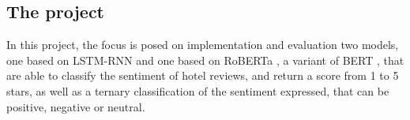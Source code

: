     \subsection{The project}
    \label{subsec:the_project}
        In this project, the focus is posed on implementation and evaluation two models, one based on LSTM-RNN 
        and one based on RoBERTa \citep{liu2019robertarobustlyoptimizedbert}, a variant of BERT \citep{devlin2019bert},
        that are able to classify the sentiment of hotel reviews, and return a score from 1 to 5 stars, as well
        as a ternary classification of the sentiment expressed, that can be positive, negative or 
        neutral.